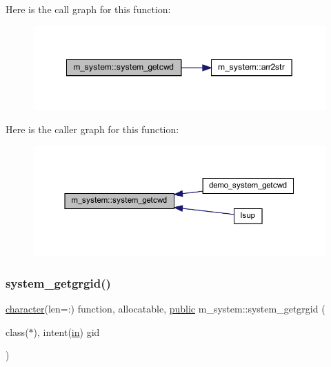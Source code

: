 Here is the call graph for this function\+:
\nopagebreak
\begin{figure}[H]
\begin{center}
\leavevmode
\includegraphics[width=349pt]{namespacem__system_a5a32db818a9ffb0a4ea724e95356c560_cgraph}
\end{center}
\end{figure}
Here is the caller graph for this function\+:
\nopagebreak
\begin{figure}[H]
\begin{center}
\leavevmode
\includegraphics[width=350pt]{namespacem__system_a5a32db818a9ffb0a4ea724e95356c560_icgraph}
\end{center}
\end{figure}
\mbox{\label{namespacem__system_aec137429fbb8c848db4ecd914466d7e8}} 
\subsubsection{\texorpdfstring{system\+\_\+getgrgid()}{system\_getgrgid()}}
{\footnotesize\ttfamily \hyperlink{option__stopwatch_83_8txt_abd4b21fbbd175834027b5224bfe97e66}{character}(len=\+:) function, allocatable, \hyperlink{M__stopwatch_83_8txt_a2f74811300c361e53b430611a7d1769f}{public} m\+\_\+system\+::system\+\_\+getgrgid (\begin{DoxyParamCaption}\item[{class($\ast$), intent(\hyperlink{M__journal_83_8txt_afce72651d1eed785a2132bee863b2f38}{in})}]{gid }\end{DoxyParamCaption})}



